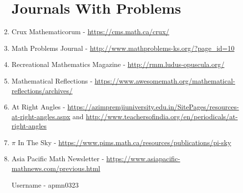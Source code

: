 \documentclass{article}
\begin{document}
\begin{enumerate}
\section*{Journals With Problems}
\item Crux Mathematicorum - \url{https://cms.math.ca/crux/}
\item Math Problems Journal - \url{http://www.mathproblems-ks.org/?page_id=10}
\item Recreational Mathematics Magazine - \url{http://rmm.ludus-opuscula.org/}
\item Mathematical Reflections - \url{https://www.awesomemath.org/mathematical-reflections/archives/}
\item At Right Angles - \url {https://azimpremjiuniversity.edu.in/SitePages/resources-at-right-angles.aspx} and \url{http://www.teachersofindia.org/en/periodicals/at-right-angles}
\item $\pi$ In The Sky - \url{https://www.pims.math.ca/resources/publications/pi-sky}
\item Asia Pacific Math Newsletter - \url{https://www.asiapacific-mathnews.com/previous.html} 

Username - apmn0323


\end{enumerate}
\end{document}

